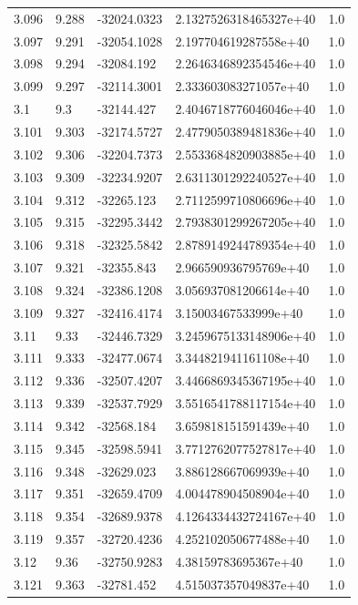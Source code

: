 \begin{tabular}{lllll}
3.096 & 9.288 & -32024.0323 & 2.1327526318465327e+40 & 1.0 \\
3.097 & 9.291 & -32054.1028 & 2.197704619287558e+40 & 1.0 \\
3.098 & 9.294 & -32084.192 & 2.2646346892354546e+40 & 1.0 \\
3.099 & 9.297 & -32114.3001 & 2.333603083271057e+40 & 1.0 \\
3.1 & 9.3 & -32144.427 & 2.4046718776046046e+40 & 1.0 \\
3.101 & 9.303 & -32174.5727 & 2.4779050389481836e+40 & 1.0 \\
3.102 & 9.306 & -32204.7373 & 2.5533684820903885e+40 & 1.0 \\
3.103 & 9.309 & -32234.9207 & 2.6311301292240527e+40 & 1.0 \\
3.104 & 9.312 & -32265.123 & 2.7112599710806696e+40 & 1.0 \\
3.105 & 9.315 & -32295.3442 & 2.7938301299267205e+40 & 1.0 \\
3.106 & 9.318 & -32325.5842 & 2.8789149244789354e+40 & 1.0 \\
3.107 & 9.321 & -32355.843 & 2.966590936795769e+40 & 1.0 \\
3.108 & 9.324 & -32386.1208 & 3.056937081206614e+40 & 1.0 \\
3.109 & 9.327 & -32416.4174 & 3.15003467533999e+40 & 1.0 \\
3.11 & 9.33 & -32446.7329 & 3.2459675133148906e+40 & 1.0 \\
3.111 & 9.333 & -32477.0674 & 3.344821941161108e+40 & 1.0 \\
3.112 & 9.336 & -32507.4207 & 3.4466869345367195e+40 & 1.0 \\
3.113 & 9.339 & -32537.7929 & 3.5516541788117154e+40 & 1.0 \\
3.114 & 9.342 & -32568.184 & 3.659818151591439e+40 & 1.0 \\
3.115 & 9.345 & -32598.5941 & 3.7712762077527817e+40 & 1.0 \\
3.116 & 9.348 & -32629.023 & 3.886128667069939e+40 & 1.0 \\
3.117 & 9.351 & -32659.4709 & 4.004478904508904e+40 & 1.0 \\
3.118 & 9.354 & -32689.9378 & 4.1264334432724167e+40 & 1.0 \\
3.119 & 9.357 & -32720.4236 & 4.252102050677488e+40 & 1.0 \\
3.12 & 9.36 & -32750.9283 & 4.38159783695367e+40 & 1.0 \\
3.121 & 9.363 & -32781.452 & 4.515037357049837e+40 & 1.0 \\

\end{tabular}
